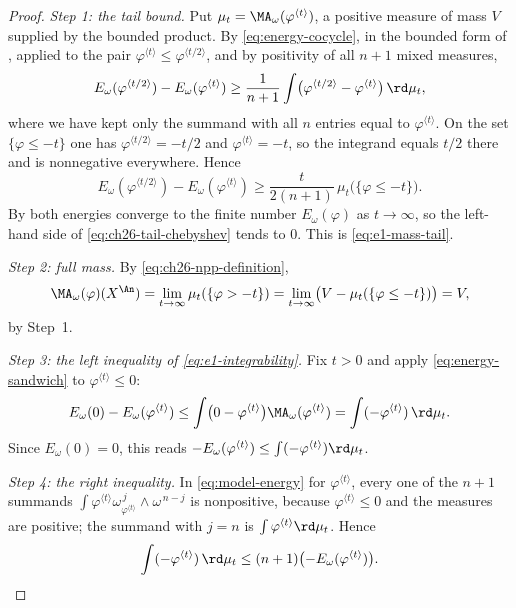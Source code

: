 \begin{proof}
\emph{Step 1: the tail bound.}  Put
$\mu_t=\MA_\omega(\varphi^{\langle t\rangle})$, a positive measure of mass
$V$ supplied by the bounded product.  By
\eqref{eq:energy-cocycle}, in the bounded form of
, applied to the pair
$\varphi^{\langle t\rangle}\leq\varphi^{\langle t/2\rangle}$, and by
positivity of all $n+1$ mixed measures,
\[
 E_\omega(\varphi^{\langle t/2\rangle})
 -E_\omega(\varphi^{\langle t\rangle})
 \geq\frac1{n+1}
 \int\bigl(\varphi^{\langle t/2\rangle}
          -\varphi^{\langle t\rangle}\bigr)\,\rd \mu_t ,
\]
where we have kept only the summand with all $n$ entries equal to
$\varphi^{\langle t\rangle}$.  On the set $\{\varphi\leq-t\}$ one has
$\varphi^{\langle t/2\rangle}=-t/2$ and
$\varphi^{\langle t\rangle}=-t$, so the integrand equals $t/2$ there and
is nonnegative everywhere.  Hence
\begin{equation}
\label{eq:ch26-tail-chebyshev}
 E_\omega(\varphi^{\langle t/2\rangle})
 -E_\omega(\varphi^{\langle t\rangle})
 \geq\frac{t}{2(n+1)}\,\mu_t\bigl(\{\varphi\leq-t\}\bigr).
\end{equation}
By  both energies converge to the finite
number $E_\omega(\varphi)$ as $t\to\infty$, so the left-hand side of
\eqref{eq:ch26-tail-chebyshev} tends to $0$.  This is
\eqref{eq:e1-mass-tail}.

\emph{Step 2: full mass.}  By \eqref{eq:ch26-npp-definition},
\[
 \MA_\omega(\varphi)(X^{\An})
 =\lim_{t\to\infty}\mu_t(\{\varphi>-t\})
 =\lim_{t\to\infty}\bigl(V-\mu_t(\{\varphi\leq-t\})\bigr)=V,
\]
by Step~1.

\emph{Step 3: the left inequality of \eqref{eq:e1-integrability}.}  Fix
$t>0$ and apply \eqref{eq:energy-sandwich} to
$\varphi^{\langle t\rangle}\leq0$:
\[
 E_\omega(0)-E_\omega(\varphi^{\langle t\rangle})
 \leq\int\bigl(0-\varphi^{\langle t\rangle}\bigr)
      \MA_\omega(\varphi^{\langle t\rangle})
 =\int(-\varphi^{\langle t\rangle})\,\rd\mu_t .
\]
Since $E_\omega(0)=0$, this reads
$-E_\omega(\varphi^{\langle t\rangle})\leq\int(-\varphi^{\langle
t\rangle})\rd\mu_t$.

\emph{Step 4: the right inequality.}  In \eqref{eq:model-energy} for
$\varphi^{\langle t\rangle}$, every one of the $n+1$ summands
$\int\varphi^{\langle t\rangle}
\omega_{\varphi^{\langle t\rangle}}^{\,j}\wedge\omega^{\,n-j}$
is nonpositive, because $\varphi^{\langle t\rangle}\leq0$ and the measures
are positive; the summand with $j=n$ is
$\int\varphi^{\langle t\rangle}\rd\mu_t$.  Hence
\[
 \int(-\varphi^{\langle t\rangle})\,\rd\mu_t
 \leq(n+1)\bigl(-E_\omega(\varphi^{\langle t\rangle})\bigr).
\]


\end{proof}
